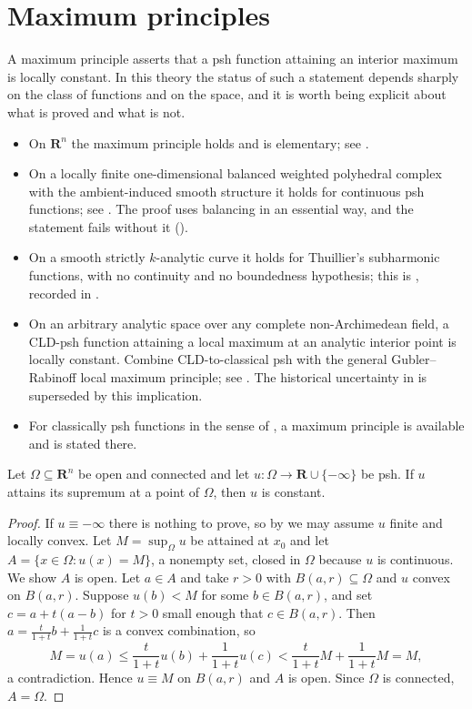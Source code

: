 \section{Maximum principles}
\label{sec:ch15-maximum}

A maximum principle asserts that a psh function attaining an interior maximum
is locally constant.  In this theory the status of such a statement depends
sharply on the class of functions and on the space, and it is worth being
explicit about what is proved and what is not.

\begin{itemize}
\item On $\mathbf R^n$ the maximum principle holds and is elementary; see
  .
\item On a locally finite one-dimensional balanced weighted polyhedral
  complex with the ambient-induced smooth structure it holds for
  continuous psh functions; see .  The proof uses
  balancing in an essential way, and the statement fails without it
  ().
\item On a smooth strictly $k$-analytic curve it holds for Thuillier's
  subharmonic functions, with no continuity and no boundedness hypothesis;
  this is \cite[Proposition~3.1.11]{Thu05}, recorded in
  .
\item On an arbitrary analytic space over any complete non-Archimedean
  field, a CLD-psh function attaining a local maximum at an analytic
  interior point is locally constant.  Combine CLD-to-classical psh with
  the general Gubler--Rabinoff local maximum principle; see
  .  The historical uncertainty in
  \cite[\S0.3.5]{CLD25} is superseded by this implication.
\item For classically psh functions in the sense of
  , a maximum principle is available and is stated
  there.
\end{itemize}

\begin{proposition}
\label{prop:ch15-max-convex}
Let $\Omega\subseteq\mathbf R^n$ be open and connected and let
$u:\Omega\to\mathbf R\cup\{-\infty\}$ be psh.  If $u$ attains its supremum at
a point of $\Omega$, then $u$ is constant.
\end{proposition}

\begin{proof}
If $u\equiv-\infty$ there is nothing to prove, so by
 we may assume $u$ finite and locally convex.
Let $M=\sup_\Omega u$ be attained at $x_0$ and let
$A=\{x\in\Omega:u(x)=M\}$, a nonempty set, closed in $\Omega$ because $u$ is
continuous.  We show $A$ is open.  Let $a\in A$ and take $r>0$ with
$B(a,r)\subseteq\Omega$ and $u$ convex on $B(a,r)$.  Suppose $u(b)<M$ for
some $b\in B(a,r)$, and set $c=a+t(a-b)$ for $t>0$ small enough that
$c\in B(a,r)$.  Then $a=\frac{t}{1+t}b+\frac{1}{1+t}c$ is a convex
combination, so
\[
 M=u(a)\le\frac{t}{1+t}u(b)+\frac{1}{1+t}u(c)
 <\frac{t}{1+t}M+\frac{1}{1+t}M=M,
\]
a contradiction.  Hence $u\equiv M$ on $B(a,r)$ and $A$ is open.  Since
$\Omega$ is connected, $A=\Omega$.
\end{proof}


